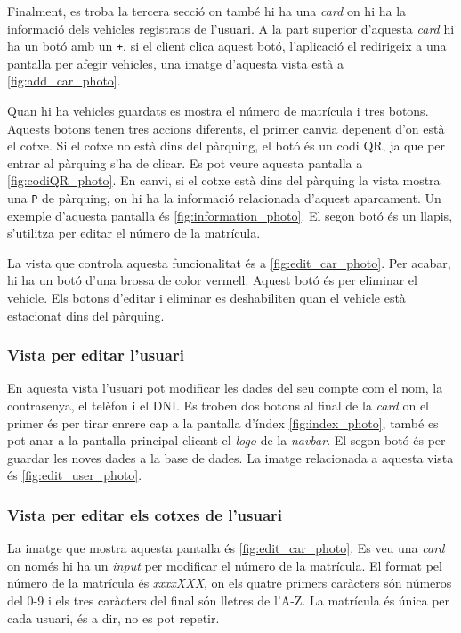 Finalment, es troba la tercera secció on també hi ha una \emph{card} on hi ha la informació dels vehicles
registrats de l'usuari. A la part superior d'aquesta \emph{card} hi ha un botó amb un \texttt{+},
si el client clica aquest botó, l'aplicació el redirigeix a una pantalla
per afegir vehicles, una imatge d'aquesta vista està a \autoref{fig:add_car_photo}.

Quan hi ha vehicles guardats es mostra el número de matrícula i tres botons. Aquests botons tenen tres
accions diferents, el primer canvia depenent d'on està el cotxe. Si el cotxe no està dins del pàrquing,
el botó és un codi QR, ja que per entrar al pàrquing s'ha de clicar. Es pot veure aquesta pantalla a
\autoref{fig:codiQR_photo}. En canvi, si el cotxe està dins del pàrquing la vista mostra una \texttt{P}
de pàrquing, on hi ha la informació relacionada d'aquest aparcament.
Un exemple d'aquesta pantalla és \autoref{fig:information_photo}.
El segon botó és un llapis, s'utilitza per editar el número de la matrícula.

La vista que controla aquesta funcionalitat és a \autoref{fig:edit_car_photo}. Per acabar, hi ha un botó
d'una brossa de color vermell. Aquest botó és per eliminar el vehicle.
Els botons d'editar i eliminar es deshabiliten quan el vehicle està estacionat dins del pàrquing.

\subsubsection{Vista per editar l'usuari}
En aquesta vista l'usuari pot modificar les dades del seu compte com el nom, la contrasenya, el telèfon i el DNI.
Es troben dos botons al final de la \emph{card} on el primer és per tirar enrere cap a la pantalla d'índex
\autoref{fig:index_photo}, també es pot anar a la pantalla principal clicant el \emph{logo} de la \emph{navbar}.
El segon botó és per guardar les noves dades a la base de dades. La imatge relacionada a aquesta vista és \autoref{fig:edit_user_photo}.

\subsubsection{Vista per editar els cotxes de l'usuari}
La imatge que mostra aquesta pantalla és \autoref{fig:edit_car_photo}. Es veu una \emph{card} on només hi ha un \emph{input}
per modificar el número de la matrícula.
El format pel número de la matrícula és \emph{xxxxXXX}, on els quatre primers caràcters són números del 0-9
i els tres caràcters del final són lletres de l'A-Z. La matrícula és única per cada usuari, és a dir, no es pot repetir.

